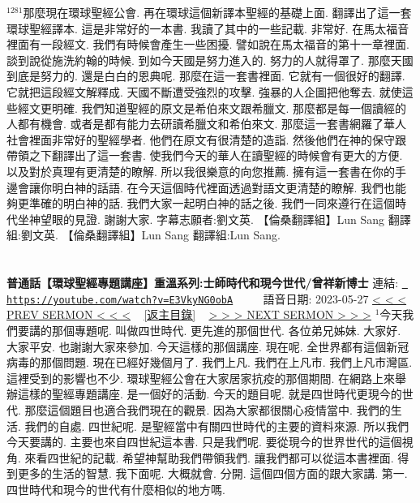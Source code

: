 \documentclass{book}
\begin{document}
$^{1281}$那麼現在環球聖經公會.
再在環球這個新譯本聖經的基礎上面.
翻譯出了這一套環球聖經譯本.
這是非常好的一本書.
我讀了其中的一些記載.
非常好.
在馬太福音裡面有一段經文.
我們有時候會產生一些困擾.
譬如說在馬太福音的第十一章裡面.
談到說從施洗約翰的時候.
到如今天國是努力進入的.
努力的人就得罩了.
那麼天國到底是努力的.
還是白白的恩典呢.
那麼在這一套書裡面.
它就有一個很好的翻譯.
它就把這段經文解釋成.
天國不斷遭受強烈的攻擊.
強暴的人企圖把他奪去.
就使這些經文更明確.
我們知道聖經的原文是希伯來文跟希臘文.
那麼都是每一個讀經的人都有機會.
或者是都有能力去研讀希臘文和希伯來文.
那麼這一套書網羅了華人社會裡面非常好的聖經學者.
他們在原文有很清楚的造詣.
然後他們在神的保守跟帶領之下翻譯出了這一套書.
使我們今天的華人在讀聖經的時候會有更大的方便.
以及對於真理有更清楚的瞭解.
所以我很樂意的向您推薦.
擁有這一套書在你的手邊會讓你明白神的話語.
在今天這個時代裡面透過對語文更清楚的瞭解.
我們也能夠更準確的明白神的話.
我們大家一起明白神的話之後.
我們一同來遵行在這個時代坐神望眼的見證.
謝謝大家.
字幕志願者:劉文英.
【倫桑翻譯組】Lun Sang 翻譯組:劉文英.
【倫桑翻譯組】Lun Sang 翻譯組:Lun Sang.
\newpage



\section{}
\label{sec:E3VkyNG0obA}
\textbf{普通話【環球聖經專題講座】重溫系列:士師時代和現今世代/曾祥新博士}
\newline
\newline
連結: \href{https://youtube.com/watch?v=E3VkyNG0obA}{\texttt{ https://youtube.com/watch?v=E3VkyNG0obA}} ~~~~ 語音日期: 2023-05-27 
\newline
\newline
\hyperref[sec:NryoQVs7NC8]{\small{< < < PREV SERMON < < <}}
~
\hyperref[sec:index]{\small{[返主目錄]}}
~
\hyperref[sec:_SGZrxvXYCM]{\small{> > > NEXT SERMON > > >}}
\newline
\newline
$^{1}$今天我們要講的那個專題呢.
叫做四世時代.
更先進的那個世代.
各位弟兄姊妹.
大家好.
大家平安.
也謝謝大家來參加.
今天這樣的那個講座.
現在呢.
全世界都有這個新冠病毒的那個問題.
現在已經好幾個月了.
我們上凡.
我們在上凡市.
我們上凡市灣區.
這裡受到的影響也不少.
環球聖經公會在大家居家抗疫的那個期間.
在網路上來舉辦這樣的聖經專題講座.
是一個好的活動.
今天的題目呢.
就是四世時代更現今的世代.
那麼這個題目也適合我們現在的觀景.
因為大家都很關心疫情當中.
我們的生活.
我們的自處.
四世紀呢.
是聖經當中有關四世時代的主要的資料來源.
所以我們今天要講的.
主要也來自四世紀這本書.
只是我們呢.
要從現今的世界世代的這個視角.
來看四世紀的記載.
希望神幫助我們帶領我們.
讓我們都可以從這本書裡面.
得到更多的生活的智慧.
我下面呢.
大概就會.
分開.
這個四個方面的跟大家講.
第一.
四世時代和現今的世代有什麼相似的地方嗎.
\end{document}
